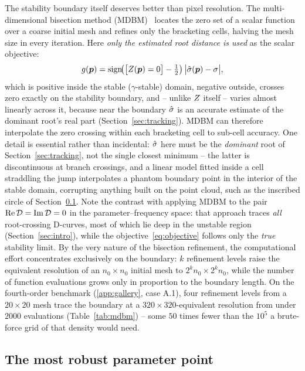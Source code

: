 The stability boundary itself deserves better than pixel resolution. The
multi-dimensional bisection method (MDBM)~\cite{bachrathy2012bisection,bachrathy2025mdbm}
locates the zero set of a scalar function over a coarse initial mesh and
refines only the bracketing cells, halving the mesh size in every iteration.
Here \emph{only the estimated root distance is used} as the scalar objective:
\begin{equation}\label{eq:objective}
  g(\boldsymbol{p}) = \operatorname{sign}\!\bigl(\bigl[Z(\boldsymbol{p})=0\bigr]-\tfrac12\bigr)\,
               \bigl|\hat{\sigma}(\boldsymbol{p})-\sigma\bigr|,
\end{equation}
which is positive inside the stable ($\gamma$-stable) domain, negative
outside, crosses zero exactly on the stability boundary, and -- unlike
$Z$ itself -- varies almost linearly across it, because near the
boundary $\hat{\sigma}$ is an accurate estimate of the dominant root's real part
(Section~\ref{sec:tracking}). MDBM can therefore interpolate the zero
crossing within each bracketing cell to sub-cell accuracy. One detail is
essential rather than incidental: $\hat{\sigma}$ here must be the \emph{dominant}
root of Section~\ref{sec:tracking}, not the single closest minimum -- the
latter is discontinuous at branch crossings, and a linear model fitted
inside a cell straddling the jump interpolates a phantom boundary point in
the interior of the stable domain, corrupting anything built on the point
cloud, such as the inscribed circle of Section~\ref{sec:robust}. Note the contrast
with applying MDBM to the pair
$\operatorname{Re}\mathcal{D}=\operatorname{Im}\mathcal{D}=0$ in the parameter--frequency space: that approach
traces \emph{all} root-crossing D-curves, most of which lie deep in the
unstable region (Section~\ref{sec:intro}), while the
objective~\eqref{eq:objective} follows only the \emph{true} stability limit.
By the very nature of the bisection refinement, the computational effort
concentrates exclusively on the boundary: $k$ refinement levels raise the
equivalent resolution of an $n_0\times n_0$ initial mesh to
$2^{k}n_0\times 2^{k}n_0$, while the number of function evaluations grows
only in proportion to the boundary length. On the fourth-order benchmark
(\ref{app:gallery}, case A.1), four refinement levels from a $20\times20$
mesh trace the boundary at a $320\times320$-equivalent resolution from
under $2000$ evaluations (Table~\ref{tab:mdbm}) -- some $50$ times fewer
than the $10^{5}$ a brute-force grid of that density would need.

\subsection{The most robust parameter point}\label{sec:robust}

